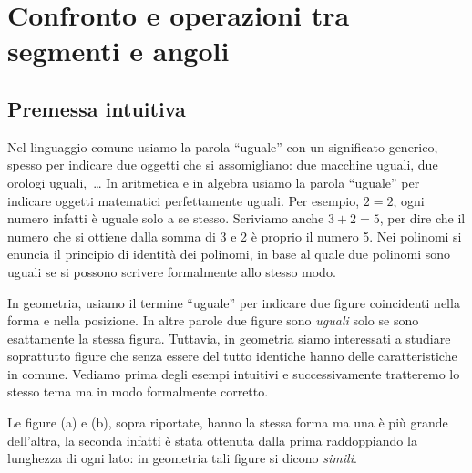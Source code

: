 \vspazio\ovalbox{\risolvii \ref{ese:1.51}, \ref{ese:1.52}, 
\ref{ese:1.53}, \ref{ese:1.54}, \ref{ese:1.55}, \ref{ese:1.56}, 
\ref{ese:1.57}, \ref{ese:1.58}, \ref{ese:1.59}, \ref{ese:1.60}, 
\ref{ese:1.61}, \ref{ese:1.62}, \ref{ese:1.63},
}

\ovalbox{\ref{ese:1.64}, \ref{ese:1.65}}


\section{Confronto e operazioni tra segmenti e 
angoli}\label{sect:operazioni_segmenti_angoli}

\subsection{Premessa intuitiva}

Nel linguaggio comune usiamo la parola ``uguale'' con un significato 
generico, spesso per indicare due oggetti che si assomigliano: due 
macchine uguali, due orologi uguali,~\ldots{} In aritmetica e in 
algebra usiamo la parola ``uguale'' per indicare oggetti matematici 
perfettamente uguali. Per esempio, $2=2$, ogni numero infatti è 
uguale solo a se stesso. Scriviamo anche $3+2=5$, per dire che il 
numero che si ottiene dalla somma di 3 e 2 è proprio il numero 5. Nei 
polinomi si enuncia il principio di identità dei polinomi, in base al 
quale due polinomi sono uguali se si possono scrivere formalmente 
allo stesso modo.

In geometria, usiamo il termine ``uguale'' per indicare due figure 
coincidenti nella forma e nella posizione. In altre parole due figure 
sono \emph{uguali} solo se sono esattamente la stessa figura. 
Tuttavia, in geometria siamo interessati a studiare soprattutto 
figure che senza essere del tutto identiche hanno delle 
caratteristiche in comune. Vediamo prima degli esempi intuitivi e 
successivamente tratteremo lo stesso tema ma in modo formalmente 
corretto.


\begin{inaccessibleblock}
 \begin{figure}[htb]
\centering\qquad\qquad

\end{figure}
\end{inaccessibleblock}

Le figure (a) e (b), sopra riportate, hanno la stessa forma ma una è 
più grande dell'altra, la seconda infatti è stata ottenuta dalla 
prima raddoppiando la lunghezza di ogni lato: in geometria tali 
figure si dicono \emph{simili}.

